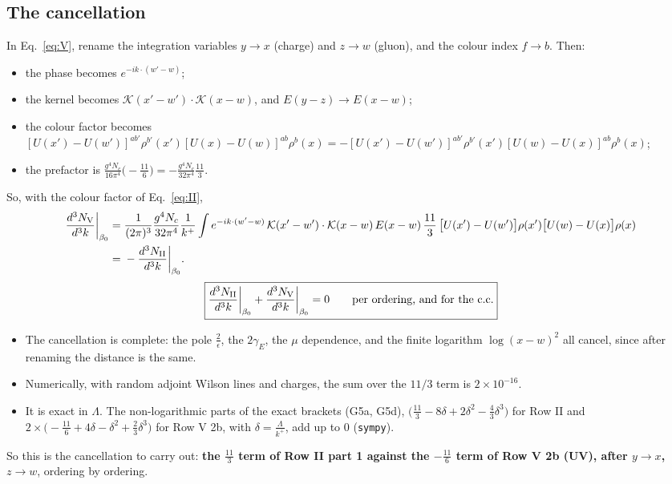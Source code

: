 \documentclass[10pt]{article}
\numberwithin{equation}{section}
\begin{document}
\subsection{The cancellation}
In Eq.~\eqref{eq:V}, rename the integration variables $y\to x$ (charge) and $z\to w$ (gluon), and the colour index $f\to b$. Then:
\begin{itemize}
\item the phase becomes $e^{-ik\cdot(w'-w)}$;
\item the kernel becomes $\mathcal K(x'-w')\cdot\mathcal K(x-w)$, and $E(y-z)\to E(x-w)$;
\item the colour factor becomes $[U(x')-U(w')]^{ab'}\rho^{b'}(x')[U(x)-U(w)]^{ab}\rho^b(x)=-[U(x')-U(w')]^{ab'}\rho^{b'}(x')[U(w)-U(x)]^{ab}\rho^b(x)$;
\item the prefactor is $\frac{g^4N_c}{16\pi^4}\big(-\frac{11}{6}\big)=-\frac{g^4N_c}{32\pi^4}\frac{11}{3}$.
\end{itemize}
So, with the colour factor of Eq.~\eqref{eq:II},
\begin{align}
\frac{d^3N_{\rm V}}{d^3k}\bigg|_{\beta_0}={}&\frac{1}{(2\pi)^3}\frac{g^4N_c}{32\pi^4}\frac{1}{k^+}\int e^{-ik\cdot(w'-w)}\,\mathcal K(x'-w')\cdot\mathcal K(x-w)\,E(x-w)\,\frac{11}{3}\,\big[U(x')-U(w')\big]\rho(x')\big[U(w)-U(x)\big]\rho(x)\notag\\
={}&-\frac{d^3N_{\rm II}}{d^3k}\bigg|_{\beta_0}.
\end{align}
\begin{equation}
\boxed{\frac{d^3N_{\rm II}}{d^3k}\bigg|_{\beta_0}+\frac{d^3N_{\rm V}}{d^3k}\bigg|_{\beta_0}=0\qquad\text{per ordering, and for the c.c.}}
\end{equation}
\begin{itemize}
\item The cancellation is complete: the pole $\frac2\epsilon$, the $2\gamma_E$, the $\mu$ dependence, and the finite logarithm $\log(x-w)^2$ all cancel, since after renaming the distance is the same.
\item Numerically, with random adjoint Wilson lines and charges, the sum over the $11/3$ term is $2\times10^{-16}$.
\item It is exact in $\Lambda$. The non-logarithmic parts of the exact brackets (G5a, G5d), $\big(\frac{11}{3}-8\delta+2\delta^2-\frac43\delta^3\big)$ for Row II and $2\times\big(-\frac{11}{6}+4\delta-\delta^2+\frac23\delta^3\big)$ for Row V 2b, with $\delta=\frac{\Lambda}{k^+}$, add up to $0$ (\texttt{sympy}).
\end{itemize}
So this is the cancellation to carry out: \textbf{the $\frac{11}{3}$ term of Row II part 1 against the $-\frac{11}{6}$ term of Row V 2b (UV), after $y\to x$, $z\to w$}, ordering by ordering.
\end{document}
